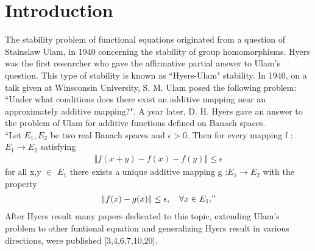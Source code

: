 \documentclass[a4paper,12pt]{report}
\begin{document}
	\tableofcontents
	\thispagestyle{empty}
	\theoremstyle{definition}
	
	\newtheorem{note}{Note}
	\newtheorem*{note*}{Note}
	\newtheorem*{solution*}{Solution}
	\clearpage
	\setcounter{page}{1}
	\setcounter{chapter}{0}
	\chapter{Introduction}
	\quad The stability  problem of functional equations originated from a \linebreak question of Stainslaw Ulam, in 1940 concerning the stability of group homomorphisms. Hyers was the first researcher who gave the \linebreak affirmative partial answer to Ulam's question. This type of \linebreak stability is known as ``Hyers-Ulam" stability. In 1940, on a talk given at Winsconsin University, S. M. Ulam posed the following \linebreak
	problem: ``Under  what  conditions   does there exist an additive \linebreak mapping near an  approximately additive   mapping?". A year later, D. H. Hyers gave an answer to the problem of Ulam for additive \linebreak functions defined on Banach spaces. \\
	\indent ``Let $E_1,E_2$  be two real Banach spaces and $\epsilon>0$.  Then for every mapping f : $E_1 \rightarrow E_2$ satisfying 
	\begin{eqnarray}
		\Vert {f(x+y) - f(x) - f(y)} \Vert \le \epsilon
	\end{eqnarray}
for all x,y $\in$ $E_1$ there exists a unique additive mapping g :$E_1 \rightarrow E_2$ with the property
\begin{eqnarray}
	 \Vert f(x) - g(x) \Vert \le \epsilon,  \quad \forall x \in E_1."
\end{eqnarray}
\indent After Hyers result many papers dedicated to this topic, extending Ulam's problem to other funtional equation and generalizing Hyers result in various directions, were published [3,4,6,7,10,20].\\
\end{document}
